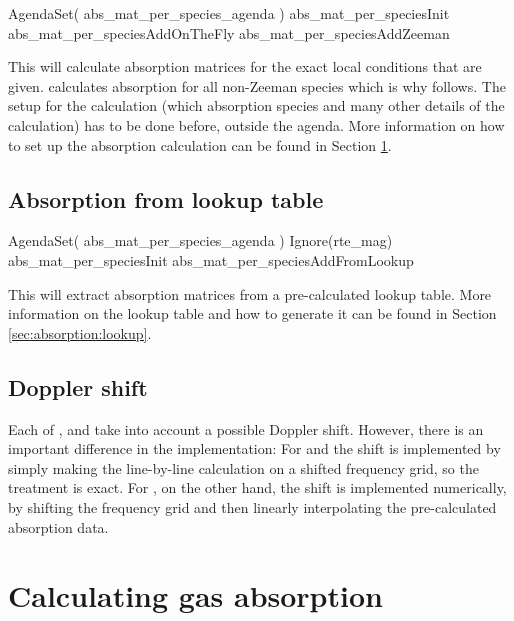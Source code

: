 \begin{code}
AgendaSet( abs_mat_per_species_agenda )
{
 abs_mat_per_speciesInit
 abs_mat_per_speciesAddOnTheFly
 abs_mat_per_speciesAddZeeman
}
\end{code}

This will calculate absorption matrices for the exact local
conditions that are given.   calculates
absorption for all non-Zeeman species which is why 
follows.
The setup for the calculation (which
absorption species and many other details of the calculation) has to
be done before, outside the agenda.  More information on how to set up
the absorption calculation can be found in Section
\ref{sec:absorption:calculating}.  

\subsection{Absorption from lookup table}

\begin{code}
AgendaSet( abs_mat_per_species_agenda )
{
 Ignore(rte_mag)
 abs_mat_per_speciesInit
 abs_mat_per_speciesAddFromLookup
}
\end{code}

This will extract absorption matrices from a pre-calculated lookup
table.  More information on the lookup table and how to generate it
can be found in Section \ref{sec:absorption:lookup}.  

\subsection{Doppler shift}
\label{sec:absorption:doppler}

Each of , 
 and
 take into account a
possible Doppler shift. However, there is an important difference in
the implementation: For  and  the shift
is implemented by simply making the line-by-line calculation on a
shifted frequency grid, so the treatment is exact. For
, on the other hand, the
shift is implemented numerically, by shifting the frequency grid and
then linearly interpolating the pre-calculated absorption data.


\section{Calculating gas absorption}
\label{sec:absorption:calculating}

